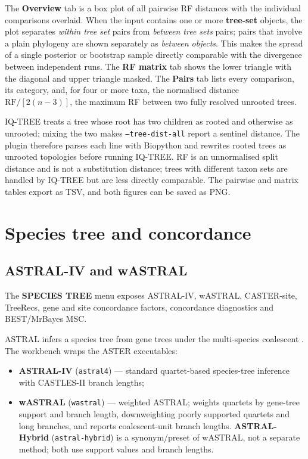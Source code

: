 \documentclass[10pt]{report}
\begin{document}
The \textbf{Overview} tab is a box plot of all pairwise RF distances with the
individual comparisons overlaid. When the input contains one or more
\textbf{tree-set} objects, the plot separates \emph{within tree set} pairs from
\emph{between tree sets} pairs; pairs that involve a plain phylogeny are shown
separately as \emph{between objects}. This makes the spread of a single
posterior or bootstrap sample directly comparable with the divergence between
independent runs. The \textbf{RF matrix} tab shows the lower triangle with the
diagonal and upper triangle masked. The \textbf{Pairs} tab lists every
comparison, its category, and, for four or more taxa, the normalised distance
$\mathrm{RF}/[2(n-3)]$, the maximum RF between two fully resolved unrooted
trees.

IQ-TREE treats a tree whose root has two children as rooted and otherwise as
unrooted; mixing the two makes \texttt{--tree-dist-all} report a sentinel
distance. The plugin therefore parses each line with Biopython and rewrites
rooted trees as unrooted topologies before running IQ-TREE. RF is an
unnormalised split distance and is not a substitution distance; trees with
different taxon sets are handled by IQ-TREE but are less directly comparable.
The pairwise and matrix tables export as TSV, and both figures can be saved as
PNG.

\chapter{Species tree and concordance}

\section{ASTRAL-IV and wASTRAL}

The \textbf{SPECIES TREE} menu exposes ASTRAL-IV, wASTRAL, CASTER-site,
TreeRecs, gene and site concordance factors, concordance diagnostics and
BEST/MrBayes MSC.

ASTRAL infers a species tree from gene trees under the multi-species
coalescent \cite{astral}. The workbench wraps the ASTER executables:

\begin{itemize}
  \item \textbf{ASTRAL-IV} (\texttt{astral4}) --- standard quartet-based
        species-tree inference with CASTLES-II branch lengths;
  \item \textbf{wASTRAL} (\texttt{wastral}) --- weighted ASTRAL; weights
        quartets by gene-tree support and branch length, downweighting poorly
        supported quartets and long branches, and reports coalescent-unit
        branch lengths. \textbf{ASTRAL-Hybrid} (\texttt{astral-hybrid}) is a
        synonym/preset of wASTRAL, not a separate method; both use support
        values and branch lengths.
\end{itemize}
\end{document}
